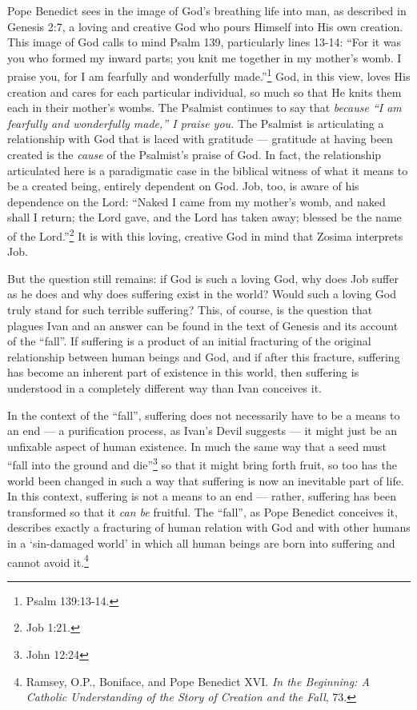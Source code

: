 Pope Benedict sees in the image of God's breathing life into man, as described in Genesis 2:7, a loving and creative God who pours Himself into His own creation. This image of God calls to mind Psalm 139, particularly lines 13-14: ``For it was you who formed my inward parts; you knit me together in my mother's womb. I praise you, for I am fearfully and wonderfully made.''\footnote{Psalm 139:13-14.} God, in this view, loves His creation and cares for each particular individual, so much so that He knits them each in their mother's wombs. The Psalmist continues to say that \emph{because ``I am fearfully and wonderfully made,'' I praise you.} The Psalmist is articulating a relationship with God that is laced with gratitude --- gratitude at having been created is the \emph{cause} of the Psalmist's praise of God. In fact, the relationship articulated here is a paradigmatic case in the biblical witness of what it means to be a created being, entirely dependent on God. Job, too, is aware of his dependence on the Lord: ``Naked I came from my mother's womb, and naked shall I return; the Lord gave, and the Lord has taken away; blessed be the name of the Lord.''\footnote{Job 1:21.} It is with this loving, creative God in mind that Zosima interprets Job.

But the question still remains: if God is such a loving God, why does Job suffer as he does and why does suffering exist in the world? Would such a loving God truly stand for such terrible suffering? This, of course, is the question that plagues Ivan and an answer can be found in the text of Genesis and its account of the ``fall''. If suffering is a product of an initial fracturing of the original relationship between human beings and God, and if after this fracture, suffering has become an inherent part of existence in this world, then suffering is understood in a completely different way than Ivan conceives it. 

In the context of the ``fall'', suffering does not necessarily have to be a means to an end --- a purification process, as Ivan's Devil suggests --- it might just be an unfixable aspect of human existence. In much the same way that a seed must ``fall into the ground and die''\footnote{John 12:24} so that it might bring forth fruit, so too has the world been changed in such a way that suffering is now an inevitable part of life. In this context, suffering is not a means to an end --- rather, suffering has been transformed so that it \emph{can be} fruitful. The ``fall'', as Pope Benedict conceives it, describes exactly a fracturing of human relation with God and with other humans in a `sin-damaged world' in which all human beings are born into suffering and cannot avoid it.\footnote{Ramsey, O.P., Boniface, and Pope Benedict XVI. \emph{In the Beginning: A Catholic Understanding of the Story of Creation and the Fall}, 73.}


